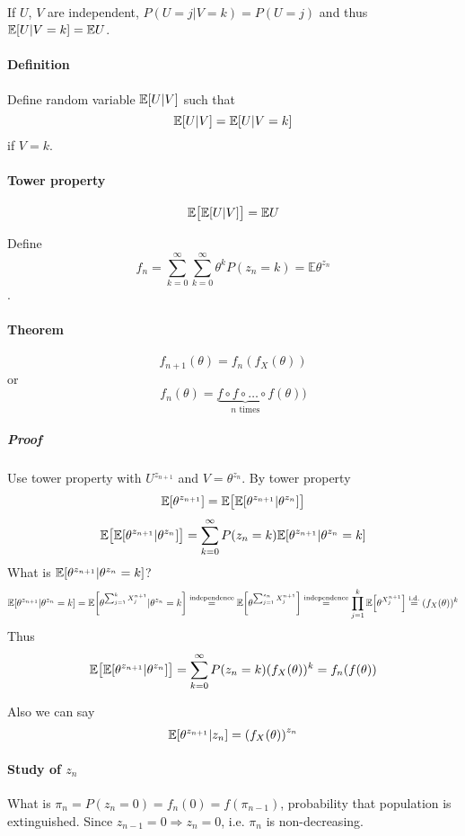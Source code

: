 \paragraph{} If $U$, $V$ are independent, $P(U=j|V=k) = P(U=j)$ and thus $\mathbb{E}\qty[ U|V=k] = \mathbb{E} U$.
\paragraph{Definition}
Define random variable $\mathbb{E}\qty[U|V]$ such that
$$\mathbb{E}\qty[U|V] = \mathbb{E}\qty[U|V=k] $$
if $V=k$.
\paragraph{Tower property}
$$\mathbb{E} \qty\big[\mathbb{E}\qty[U|V]] = \mathbb{E}U$$

Define $$f_{n} = \sum_{k=0}^\infty \sum_{k=0}^\infty \theta^{k} P(z_n=k) = \mathbb{E} \theta^{z_n}$$. 

\paragraph{Theorem} 
$$f_{n+1} (\theta) = f_n (f_X(\theta))$$
or
$$f_{n} (\theta) = \underbrace{f\circ f\circ \dots \circ f}_{n \text{ times}}(\theta))$$
\subparagraph{Proof}
Use tower property with $U^{z_{n+1}} $ and $V=\theta^{z_n}$.
By tower property
$$\mathbb{E} \qty[\theta^{z_{n+1}}] = \mathbb{E} \qty\big[\mathbb{E} \qty[\theta^{z_{n+1}}| \theta^{z_{n}}]]$$
$$ \mathbb{E} \qty\big[\mathbb{E} \qty[\theta^{z_{n+1}}| \theta^{z_{n}}]] = \sum_{k=0}^\infty P(z_n=k) \mathbb{E} \qty[\theta^{z_{n+1}}| \theta^{z_{n}}=k]$$
What is $\mathbb{E} \qty[\theta^{z_{n+1}}| \theta^{z_{n}}=k]$?
$$\mathbb{E} \qty[\theta^{z_{n+1}}| \theta^{z_{n}}=k] =\mathbb{E} \qty[\theta^{\sum_{j=1}^{k} X_j^{n+1}}| \theta^{z_{n}}=k] \stackrel{\text{independence}}{=}\mathbb{E} \qty[\theta^{\sum_{j=1}^{z_n} X_j^{n+1}}]\stackrel{\text{independence}}{=} \prod_{j=1}^k \mathbb{E} \qty[\theta^{ X_j^{n+1}}] \stackrel{\text{i.d.}}{=} (f_X(\theta))^k $$
Thus
$$ \mathbb{E} \qty\big[\mathbb{E} \qty[\theta^{z_{n+1}}| \theta^{z_{n}}]] = \sum_{k=0}^\infty P(z_n=k) (f_X(\theta))^k = f_n(f(\theta))$$

Also we can say
$$\mathbb{E} \qty[\theta^{z_{n+1}}|z_n] = \qty(f_X(\theta))^{z_n}$$

\paragraph{Study of $z_n$}
What is $\pi_n= P(z_n=0) = f_n(0) = f(\pi_{n-1})$, probability that population is extinguished. Since $z_{n-1} =0 \Rightarrow z_n=0$, i.e. $\pi_n$ is non-decreasing.

